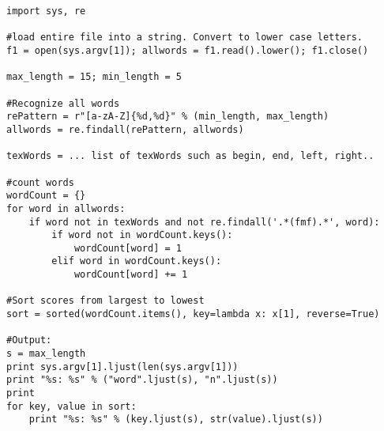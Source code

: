\documentclass{beamer}
\begin{document}
\begin{frame}[containsverbatim]
\tiny
\begin{verbatim}
import sys, re

#load entire file into a string. Convert to lower case letters.
f1 = open(sys.argv[1]); allwords = f1.read().lower(); f1.close()

max_length = 15; min_length = 5

#Recognize all words
rePattern = r"[a-zA-Z]{%d,%d}" % (min_length, max_length)
allwords = re.findall(rePattern, allwords)

texWords = ... list of texWords such as begin, end, left, right..

#count words
wordCount = {}
for word in allwords:
    if word not in texWords and not re.findall('.*(fmf).*', word):
        if word not in wordCount.keys():
            wordCount[word] = 1
        elif word in wordCount.keys():
            wordCount[word] += 1

#Sort scores from largest to lowest
sort = sorted(wordCount.items(), key=lambda x: x[1], reverse=True)

#Output:
s = max_length
print sys.argv[1].ljust(len(sys.argv[1]))
print "%s: %s" % ("word".ljust(s), "n".ljust(s))     
print
for key, value in sort:
    print "%s: %s" % (key.ljust(s), str(value).ljust(s))
\end{verbatim}
\normalsize
\end{frame}
\end{document}
